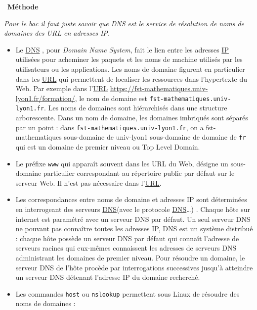 \documentclass[
  11pt,
]{article}
\newcommand{\passthrough}[1]{#1}
\newenvironment{methode}[1]
{\par \medskip    \noindent  
 \begin {bclogo}[arrondi =0.1,logo=\bcoutil, marge=4,noborder = true] {~\textbf{Méthode}   {\itshape #1} }  \par}
{
\end{bclogo}
 \par \bigskip }
\begin{document}
\begin{methode}{}

\emph{Pour le bac il faut juste savoir que DNS est le service de
résolution de noms de domaines des URL en adresses IP.}

\begin{itemize}
\item
  Le \href{https://fr.wikipedia.org/wiki/Domain_Name_System}{DNS} , pour
  \emph{Domain Name System}, fait le lien entre les adresses
  \href{https://fr.wikipedia.org/wiki/Internet_Protocol}{IP} utilisées
  pour acheminer les paquets et les noms de machine utilisés par les
  utilisateurs ou les applications. Les noms de domaine figurent en
  particulier dans les
  \href{https://fr.wikipedia.org/wiki/Uniform_Resource_Locator}{URL} qui
  permettent de localiser les ressources dans l'hypertexte du Web. Par
  exemple dans
  l'\href{https://fr.wikipedia.org/wiki/Uniform_Resource_Locator}{URL}
  \url{https://fst-mathematiques.univ-lyon1.fr/formation/}, le nom de
  domaine est \passthrough{\lstinline!fst-mathematiques.univ-lyon1.fr!}.
  Les noms de domaines sont hiérarchisés dans une structure
  arborescente. Dans un nom de domaine, les domaines imbriqués sont
  séparés par un point : dans
  \passthrough{\lstinline!fst-mathematiques.univ-lyon1.fr!}, on a
  fst-mathematiques sous-domaine de univ-lyon1 sous-domaine de domaine
  de \passthrough{\lstinline!fr!} qui est un domaine de premier niveau
  ou Top Level Domain.
\item
  Le préfixe \passthrough{\lstinline!www!} qui apparaît souvent dans les
  URL du Web, désigne un sous-domaine particulier correspondant au
  répertoire public par défaut sur le serveur Web. Il n'est pas
  nécessaire dans
  l'\href{https://fr.wikipedia.org/wiki/Uniform_Resource_Locator}{URL}.
\item
  Les correspondances entre noms de domaine et adresses IP sont
  déterminées en interrogeant des serveurs
  \href{https://fr.wikipedia.org/wiki/Domain_Name_System}{DNS}(avec le
  protocole
  \href{https://fr.wikipedia.org/wiki/Domain_Name_System}{DNS}\ldots) .
  Chaque hôte sur internet est paramétré avec un serveur DNS par défaut.
  Un seul serveur DNS ne pouvant pas connaître toutes les adresses IP,
  DNS est un système distribué : chaque hôte possède un serveur DNS par
  défaut qui connaît l'adresse de serveurs racines qui eux-mêmes
  connaissent les adresses de serveurs DNS administrant les domaines de
  premier niveau. Pour résoudre un domaine, le serveur DNS de l'hôte
  procède par interrogations successives jusqu'à atteindre un serveur
  DNS détenant l'adresse IP du domaine recherché.
\item
  Les commandes \passthrough{\lstinline!host!} ou
  \passthrough{\lstinline!nslookup!} permettent sous Linux de résoudre
  des noms de domaines :
\end{itemize}


\end{methode}
\end{document}
